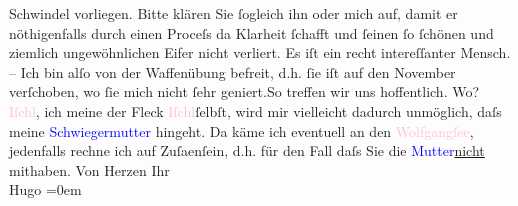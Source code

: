                Schwindel vorliegen. Bitte klären Sie ſogleich ihn oder mich auf, damit er
               nöthigenfalls durch einen Proceſs da Klarheit ſchafft und ſeinen ſo ſchönen und
               ziemlich ungewöhnlichen Eifer nicht verliert. Es iſt ein recht intereſſanter
               Mensch.\pend
           \pstart
           \centering{}{\pb}–\pend
           \pstart
           \noindent{}Ich bin alſo von der Waffenübung befreit, d.h. ſie iſt auf den November
               verſchoben, wo ſie mich nicht ſehr geniert.\hspace*{1.5em}So
               treffen wir uns hoffentlich. Wo? \textcolor{pink}{Iſchl}{}\ledrightnote{\textcolor{pink}{Bad Ischl}}, ich meine
               der Fleck \textcolor{pink}{Iſchl}{}\ledrightnote{\textcolor{pink}{Bad Ischl}}{ }ſelbſt, wird mir vielleicht dadurch unmöglich, daſs
               meine \textcolor{blue}{Schwiegermutter}{} hingeht.
               Da käme ich eventuell an den \textcolor{pink}{Wolfgangſee}{}\ledrightnote{\textcolor{pink}{Wolfgangsee}},
               jedenfalls rechne ich auf Zuſa{\geminationm}enſein, d.h. für den Fall
               daſs Sie die \textcolor{blue}{Mutter}{}\uline{nicht} mithaben.\pend
           \pstart
           Von Herzen Ihr{\\[\baselineskip]}\spacefill\mbox{Hugo}\pend
           \leftskip=0em{}\endnumbering{}  
      